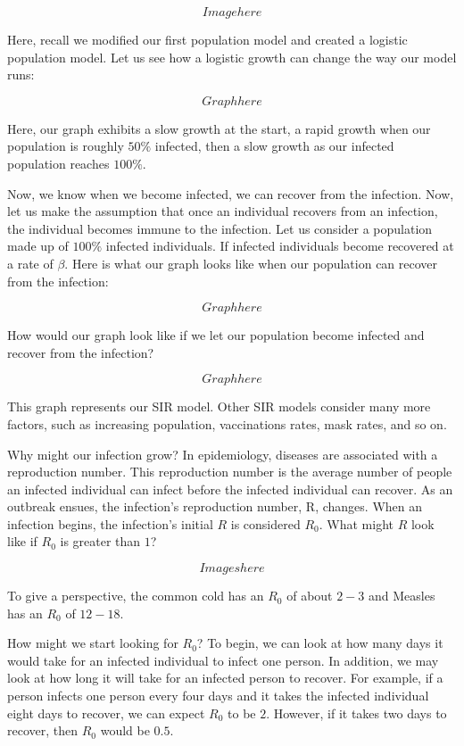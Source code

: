 \documentclass{amsart}
\theoremstyle{definition}
\numberwithin{equation}{section}
\begin{document}
\begin{sansmath}
\[ Image here \]

Here, recall we modified our first population model and created a logistic population model. Let us see how a logistic growth can change the way our model runs:

\[ Graph here \]

Here, our graph exhibits a slow growth at the start, a rapid growth when our population is roughly $50\%$ infected, then a slow growth as our infected population reaches $100\%$.

Now, we know when we become infected, we can recover from the infection. Now, let us make the assumption that once an individual recovers from an infection, the individual becomes immune to the infection. Let us consider a population made up of $100\%$ infected individuals. If infected individuals become recovered at a rate of $\beta$. Here is what our graph looks like when our population can recover from the infection:

\[ Graph here \]

How would our graph look like if we let our population become infected and recover from the infection?

\[ Graph here \]

This graph represents our SIR model. Other SIR models consider many more factors, such as increasing population, vaccinations rates, mask rates, and so on.

Why might our infection grow? In epidemiology, diseases are  associated with a reproduction number. This reproduction number is the average number of people an infected individual can infect before the infected individual can recover. As an outbreak ensues, the infection's reproduction number, R, changes. When an infection begins, the infection's initial $R$ is considered $R_0$. What might $R$ look like if $R_0$ is greater than $1$?

\[ Images here \]

To give a perspective, the common cold has an $R_0$ of about $2-3$ and Measles has an $R_0$ of $12-18$.

How might we start looking for $R_0$? To begin, we can look at how many days it would take for an infected individual to infect one person. In addition, we may look at how long it will take for an infected person to recover. For example, if a person infects one person every four days and it takes the infected individual eight days to recover, we can expect $R_0$ to be $2$. However, if it takes two days to recover, then $R_0$ would be $0.5$.


\end{sansmath}
\end{document}
